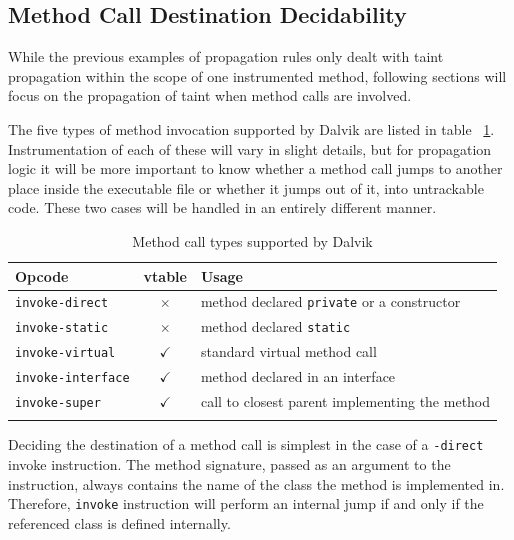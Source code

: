 \documentclass[12pt,twoside,notitlepage]{report}
\newcommand{\tick}{$\checkmark$}
\newcommand{\cross}{$\times$}
\begin{document}


\subsection{Method Call Destination Decidability}

While the previous examples of propagation rules only dealt with taint propagation within the scope of one instrumented method, following sections will focus on the propagation of taint when method calls are involved. 

The five types of method invocation supported by Dalvik are listed in table ~\ref{table:TaintPropagation_MethodCallTypes}. Instrumentation of each of these will vary in slight details, but for propagation logic it will be more important to know whether a method call jumps to another place inside the executable file or whether it jumps out of it, into untrackable code. These two cases will be handled in an entirely different manner. 

\begin{table}
	\begin{center}
	\begin{tabular}{|l|c|l|}
		\firsthline
		\textbf{Opcode}         & \footnotesize{\textbf{vtable}} & \textbf{Usage} \\
		\hline
		\verb$invoke-direct$    & \cross          & method declared \verb$private$ or a constructor \\
		\verb$invoke-static$    & \cross          & method declared \verb$static$ \\
		\hline
		\verb$invoke-virtual$   & \tick           & standard virtual method call \\
		\verb$invoke-interface$ & \tick           & method declared in an interface \\
		\verb$invoke-super$     & \tick           & call to closest parent implementing the method \\
		\lasthline
	\end{tabular}
	\end{center}
	\caption{Method call types supported by Dalvik}
	\label{table:TaintPropagation_MethodCallTypes}
\end{table}

Deciding the destination of a method call is simplest in the case of a \verb$-direct$ invoke instruction. The method signature, passed as an argument to the instruction, always contains the name of the class the method is implemented in. Therefore, \verb$invoke$ instruction will perform an internal jump if and only if the referenced class is defined internally.
\end{document}
